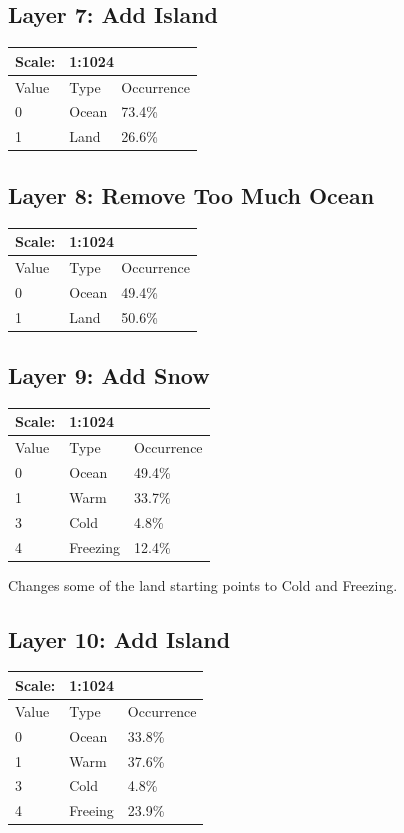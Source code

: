 \documentclass{article}
\begin{document}
	\subsection{Layer 7: Add Island}
	\begin{tabular}{|l|l|l|}\hline
		Scale: & \multicolumn{2}{|l|}{1:1024} \\\hline\hline
		Value  & Type   & Occurrence \\\hline
		0      & Ocean  & 73.4\%\\\hline
		1      & Land   & 26.6\%\\\hline
	\end{tabular}

	\subsection{Layer 8: Remove Too Much Ocean}
	\begin{tabular}{|l|l|l|}\hline
		Scale: & \multicolumn{2}{|l|}{1:1024} \\\hline\hline
		Value  & Type   & Occurrence \\\hline
		0      & Ocean  & 49.4\%\\\hline
		1      & Land   & 50.6\%\\\hline
	\end{tabular}


	\subsection{Layer 9: Add Snow}
	\begin{tabular}{|l|l|l|}\hline
		Scale: & \multicolumn{2}{|l|}{1:1024} \\\hline\hline
		Value  & Type     & Occurrence \\\hline
		0      & Ocean    & 49.4\%\\\hline
		1      & Warm     & 33.7\%\\\hline
		3      & Cold     & 4.8\%\\\hline
		4      & Freezing & 12.4\%\\\hline
	\end{tabular}

	\medskip\noindent
	Changes some of the land starting points to Cold and Freezing.

	\subsection{Layer 10: Add Island}
	\begin{tabular}{|l|l|l|}\hline
		Scale: & \multicolumn{2}{|l|}{1:1024} \\\hline\hline
		Value  & Type    & Occurrence \\\hline
		0      & Ocean   & 33.8\%\\\hline
		1      & Warm    & 37.6\%\\\hline
		3      & Cold    & 4.8\%\\\hline
		4      & Freeing & 23.9\%\\\hline
	\end{tabular}
\end{document}
